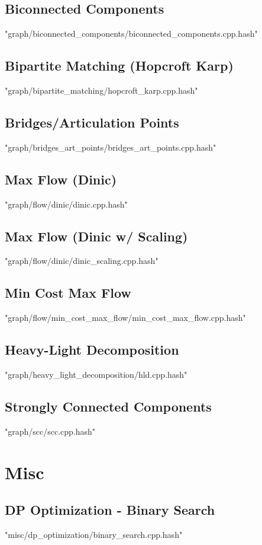 \documentclass [12pt,onecolumn,oneside]{article}
\begin{document}
\subsection{ Biconnected Components}
 {"graph/biconnected_components/biconnected_components.cpp.hash"}
\subsection{ Bipartite Matching (Hopcroft Karp)}
 {"graph/bipartite_matching/hopcroft_karp.cpp.hash"}
\subsection{ Bridges/Articulation Points}
 {"graph/bridges_art_points/bridges_art_points.cpp.hash"}
\subsection{ Max Flow (Dinic)}
 {"graph/flow/dinic/dinic.cpp.hash"}
\subsection{ Max Flow (Dinic w/ Scaling)}
 {"graph/flow/dinic/dinic_scaling.cpp.hash"}
\subsection{ Min Cost Max Flow}
 {"graph/flow/min_cost_max_flow/min_cost_max_flow.cpp.hash"}
\subsection{ Heavy-Light Decomposition}
 {"graph/heavy_light_decomposition/hld.cpp.hash"}
\subsection{ Strongly Connected Components}
 {"graph/scc/scc.cpp.hash"}
\newpage

\section{Misc}
\subsection{ DP Optimization - Binary Search}
 {"misc/dp_optimization/binary_search.cpp.hash"}
\end{document}
